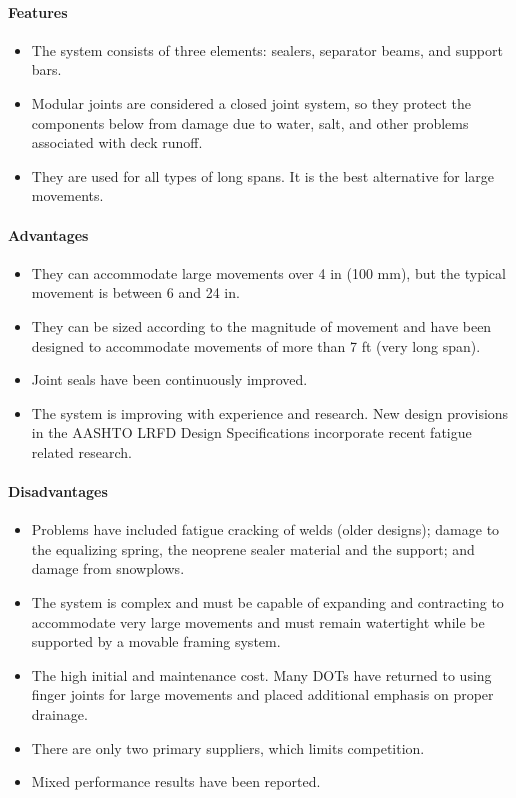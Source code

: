 \paragraph{Features}
\begin{itemize}
  \item The system consists of three elements: sealers, separator beams, and support bars.
  \item Modular joints are considered a closed joint system, so they protect the components below from damage due
  to water, salt, and other problems associated with deck runoff.
  \item  They are used for all types of long spans. It is the best alternative for large movements.
\end{itemize}
\paragraph{Advantages}
\begin{itemize}
  \item They can accommodate large movements over 4 in (100 mm), but the typical movement is between 6 and 24 in.
  \item They can be sized according to the magnitude of movement and have been designed to accommodate movements of more than 7 ft (very long span).
  \item Joint seals have been continuously improved.
  \item The system is improving with experience and research. New design provisions in the AASHTO LRFD Design Specifications incorporate recent fatigue related research.
\end{itemize}

\paragraph{Disadvantages}
\begin{itemize}
  \item Problems have included fatigue cracking of welds (older designs); damage to the equalizing spring, the neoprene sealer material and the support; and damage from snowplows.
  \item The system is complex and must be capable of expanding and contracting to accommodate very large movements and must remain watertight while be supported by a movable framing system.
  \item  The high initial and maintenance cost. Many DOTs have returned to using finger joints for large movements and placed additional emphasis on proper drainage.
  \item There are only two primary suppliers, which limits competition.
  \item Mixed performance results have been reported.
\end{itemize}


